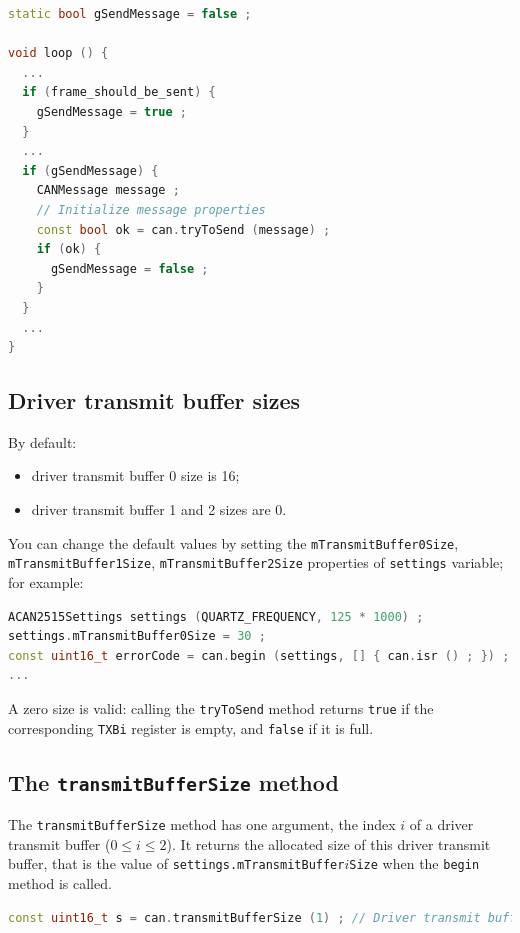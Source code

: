 \documentclass[10pt, a4paper, obeyspaces]{extarticle}
\newcommand \subsectionLabel[2]{\subsection{#1}\label{subsec:#2}}
\begin{document}
{ \small
  \begin{lstlisting}[language=c++]
static bool gSendMessage = false ;

void loop () {
  ...
  if (frame_should_be_sent) {
    gSendMessage = true ;
  }
  ...
  if (gSendMessage) {
    CANMessage message ;
    // Initialize message properties
    const bool ok = can.tryToSend (message) ;
    if (ok) {
      gSendMessage = false ;
    }
  }
  ...
}
  \end{lstlisting}
}


\subsectionLabel{Driver transmit buffer sizes}{driverTransmitBufferSize}

By default:
\begin{itemize}
  \item driver transmit buffer 0 size is 16;
  \item driver transmit buffer 1 and 2 sizes are 0.
\end{itemize}

You can change the default values by setting the \texttt{mTransmitBuffer0Size}, \texttt{mTransmitBuffer1Size}, \texttt{mTransmitBuffer2Size} properties of \texttt{settings} variable; for example:

{ \small\begin{lstlisting}[language=c++]
ACAN2515Settings settings (QUARTZ_FREQUENCY, 125 * 1000) ;
settings.mTransmitBuffer0Size = 30 ;
const uint16_t errorCode = can.begin (settings, [] { can.isr () ; }) ;
...
\end{lstlisting}}

A zero size is valid: calling the \texttt{tryToSend} method returns \texttt{true} if the corresponding \texttt{TXBi} register is empty, and \texttt{false} if it is full.



\subsection{The \texttt{transmitBufferSize} method}

The \texttt{transmitBufferSize} method has one argument, the index $i$ of a driver transmit buffer ($0 \leqslant i \leqslant 2$). It returns the allocated size of this driver transmit buffer, that is the value of \texttt{settings.mTransmitBuffer$i$Size} when the \texttt{begin} method is called.
{ \small\begin{lstlisting}[language=c++]
const uint16_t s = can.transmitBufferSize (1) ; // Driver transmit buffer 1
\end{lstlisting}}
\end{document}
